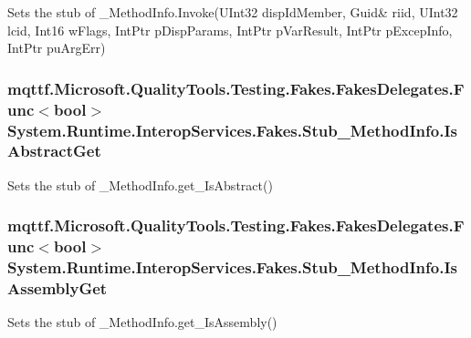 Sets the stub of \-\_\-\-Method\-Info.\-Invoke(U\-Int32 disp\-Id\-Member, Guid\& riid, U\-Int32 lcid, Int16 w\-Flags, Int\-Ptr p\-Disp\-Params, Int\-Ptr p\-Var\-Result, Int\-Ptr p\-Excep\-Info, Int\-Ptr pu\-Arg\-Err)

\hypertarget{class_system_1_1_runtime_1_1_interop_services_1_1_fakes_1_1_stub___method_info_a8aebd2a6673357ad080d90922b4ad984}{
\subsubsection[{Is\-Abstract\-Get}]{\setlength{\rightskip}{0pt plus 5cm}mqttf.\-Microsoft.\-Quality\-Tools.\-Testing.\-Fakes.\-Fakes\-Delegates.\-Func$<$bool$>$ System.\-Runtime.\-Interop\-Services.\-Fakes.\-Stub\-\_\-\-Method\-Info.\-Is\-Abstract\-Get}}\label{class_system_1_1_runtime_1_1_interop_services_1_1_fakes_1_1_stub___method_info_a8aebd2a6673357ad080d90922b4ad984}


Sets the stub of \-\_\-\-Method\-Info.\-get\-\_\-\-Is\-Abstract()

\hypertarget{class_system_1_1_runtime_1_1_interop_services_1_1_fakes_1_1_stub___method_info_ab46a1b075ead791f7fff9c3fb179fcf6}{
\subsubsection[{Is\-Assembly\-Get}]{\setlength{\rightskip}{0pt plus 5cm}mqttf.\-Microsoft.\-Quality\-Tools.\-Testing.\-Fakes.\-Fakes\-Delegates.\-Func$<$bool$>$ System.\-Runtime.\-Interop\-Services.\-Fakes.\-Stub\-\_\-\-Method\-Info.\-Is\-Assembly\-Get}}\label{class_system_1_1_runtime_1_1_interop_services_1_1_fakes_1_1_stub___method_info_ab46a1b075ead791f7fff9c3fb179fcf6}


Sets the stub of \-\_\-\-Method\-Info.\-get\-\_\-\-Is\-Assembly()

